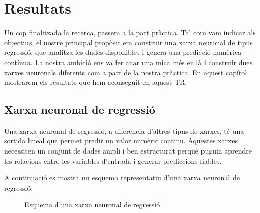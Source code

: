 \chapter{Resultats}
\label{c:Resultats}

Un cop finalitzada la recerca, passem a la part pràctica. Tal com vam indicar als objectius, el nostre principal propòsit era construir una xarxa neuronal de tipus regressió, que analitza les dades disponibles i genera una predicció numèrica contínua. La nostra ambició ens va fer anar una mica més enllà i construir dues xarxes neuronals diferents com a part de la nostra pràctica. En aquest capítol mostrarem els resultats que hem aconseguit en aquest TR.

\section{Xarxa neuronal de regressió}\label{sec:op}

Una xarxa neuronal de regressió, a diferència d’altres tipus de xarxes, té una sortida lineal que permet predir un valor numèric continu. Aquestes xarxes necessiten un conjunt de dades ampli i ben estructurat perquè puguin aprendre les relacions entre les variables d’entrada i generar prediccions fiables.

A continuació es mostra un esquema representatiu d’una xarxa neuronal de regressió:

\begin{figure}[h!]
\centering
{}
\caption{Esquema d’una xarxa neuronal de regressió}
\end{figure}

